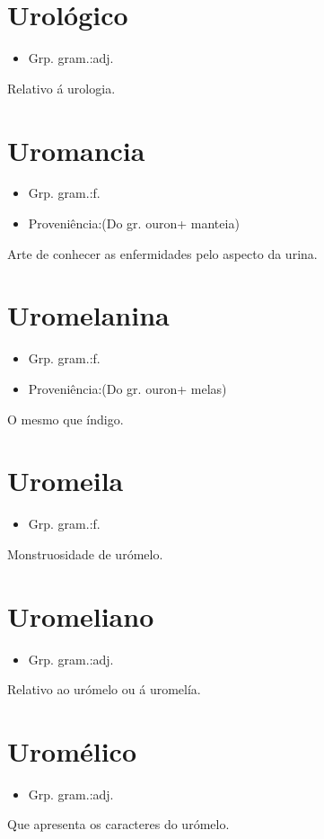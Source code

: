 \documentclass{article}
\begin{document}
\section{Urológico}
\begin{itemize}
\item {Grp. gram.:adj.}
\end{itemize}
Relativo á urologia.
\section{Uromancia}
\begin{itemize}
\item {Grp. gram.:f.}
\end{itemize}
\begin{itemize}
\item {Proveniência:(Do gr. \textunderscore ouron\textunderscore  + \textunderscore manteia\textunderscore )}
\end{itemize}
Arte de conhecer as enfermidades pelo aspecto da urina.
\section{Uromelanina}
\begin{itemize}
\item {Grp. gram.:f.}
\end{itemize}
\begin{itemize}
\item {Proveniência:(Do gr. \textunderscore ouron\textunderscore  + \textunderscore melas\textunderscore )}
\end{itemize}
O mesmo que \textunderscore índigo\textunderscore .
\section{Uromeila}
\begin{itemize}
\item {Grp. gram.:f.}
\end{itemize}
Monstruosidade de urómelo.
\section{Uromeliano}
\begin{itemize}
\item {Grp. gram.:adj.}
\end{itemize}
Relativo ao urómelo ou á uromelía.
\section{Uromélico}
\begin{itemize}
\item {Grp. gram.:adj.}
\end{itemize}
Que apresenta os caracteres do urómelo.
\end{document}
